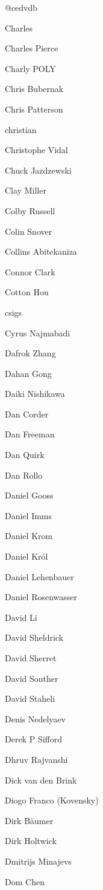\begin{DoxyItemize}
\item @cedvdb
\item Charles
\item Charles Pierce
\item Charly POLY
\item Chris Bubernak
\item Chris Patterson
\item christian
\item Christophe Vidal
\item Chuck Jazdzewski
\item Clay Miller
\item Colby Russell
\item Colin Snover
\item Collins Abitekaniza
\item Connor Clark
\item Cotton Hou
\item csigs
\item Cyrus Najmabadi
\item Dafrok Zhang
\item Dahan Gong
\item Daiki Nishikawa
\item Dan Corder
\item Dan Freeman
\item Dan Quirk
\item Dan Rollo
\item Daniel Gooss
\item Daniel Imms
\item Daniel Krom
\item Daniel Król
\item Daniel Lehenbauer
\item Daniel Rosenwasser
\item David Li
\item David Sheldrick
\item David Sherret
\item David Souther
\item David Staheli
\item Denis Nedelyaev
\item Derek P Sifford
\item Dhruv Rajvanshi
\item Dick van den Brink
\item Diogo Franco (Kovensky)
\item Dirk Bäumer
\item Dirk Holtwick
\item Dmitrijs Minajevs
\item Dom Chen

\end{DoxyItemize}
